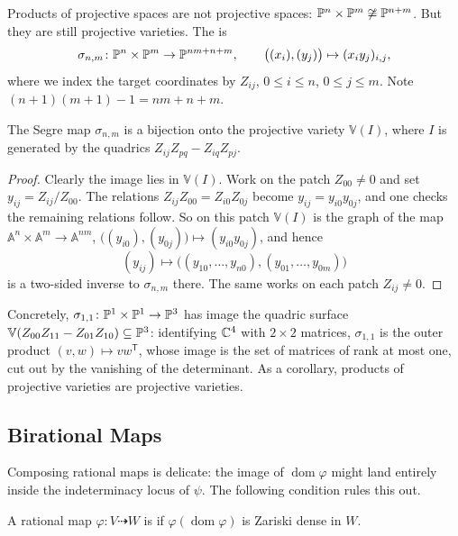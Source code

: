 \documentclass[a4paper]{scrartcl}
\newcommand{\A}{\mathbb{A}}
\newcommand{\V}{\mathbb{V}}
\newcommand{\dto}{\dashrightarrow}
\DeclareMathOperator{\dom}{dom}
\begin{document}
\begin{example}
	Products of projective spaces are not projective spaces: $\mathbb{P}^n\times\mathbb{P}^m \not\cong \mathbb{P}^{n+m}$. But they are still projective varieties. The  is
	$$\sigma_{n,m} \colon \mathbb{P}^n \times \mathbb{P}^m \to \mathbb{P}^{nm+n+m}, \qquad \big((x_i),(y_j)\big) \mapsto (x_iy_j)_{i,j},$$
	where we index the target coordinates by $Z_{ij}$, $0 \leq i \leq n$, $0 \leq j \leq m$. Note $(n+1)(m+1)-1 = nm+n+m$.
\end{example}

\begin{theorem}
	The Segre map $\sigma_{n,m}$ is a bijection onto the projective variety $\V(I)$, where $I$ is generated by the quadrics $Z_{ij}Z_{pq} - Z_{iq}Z_{pj}$.
\end{theorem}

\begin{proof}
	Clearly the image lies in $\V(I)$. Work on the patch $Z_{00} \neq 0$ and set $y_{ij} = Z_{ij}/Z_{00}$. The relations $Z_{ij}Z_{00} = Z_{i0}Z_{0j}$ become $y_{ij} = y_{i0}y_{0j}$, and one checks the remaining relations follow. So on this patch $\V(I)$ is the graph of the map $\A^n \times \A^m \to \A^{nm}$, $\big((y_{i0}),(y_{0j})\big) \mapsto (y_{i0}y_{0j})$, and hence
	$$(y_{ij}) \longmapsto \big((y_{10},\dots,y_{n0}),(y_{01},\dots,y_{0m})\big)$$
	is a two-sided inverse to $\sigma_{n,m}$ there. The same works on each patch $Z_{ij} \neq 0$.
\end{proof}

Concretely, $\sigma_{1,1} \colon \mathbb{P}^1\times\mathbb{P}^1 \to \mathbb{P}^3$ has image the quadric surface $\V(Z_{00}Z_{11} - Z_{01}Z_{10}) \subseteq \PP^3$: identifying $\mathbb{C}^4$ with $2\times 2$ matrices, $\sigma_{1,1}$ is the outer product $(v,w)\mapsto vw^{\mathsf T}$, whose image is the set of matrices of rank at most one, cut out by the vanishing of the determinant. As a corollary, products of projective varieties are projective varieties.

\subsection{Birational Maps}

Composing rational maps is delicate: the image of $\dom\varphi$ might land entirely inside the indeterminacy locus of $\psi$. The following condition rules this out.

\begin{definition}[Dominant]
	A rational map $\varphi \colon V \dto W$ is  if $\varphi(\dom\varphi)$ is Zariski dense in $W$.
\end{definition}
\end{document}
